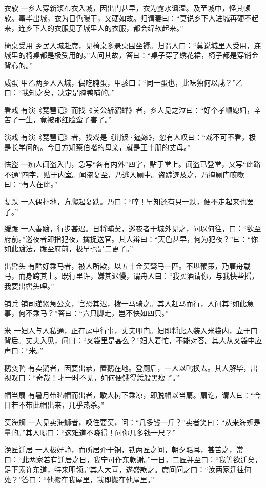 \documentclass[12pt,UTF8]{ctexbook}
\begin{document}
衣软
一乡人穿新浆布衣入城，因出门甚早，衣为露水讽湿。及至城中，怪其顿软。事毕出城，衣为日色曝干，又硬如故。归谓妻曰：“莫说乡下人进城再硬不起来，连乡下人的衣服见了城里人的衣服，都会绵软起来。”

椅桌受用
乡民入城赴席，见椅桌多悬桌围坐褥。归谓人曰：“莫说城里人受用，连城里的椅桌都是极受用的。”人问其故，答曰：“桌子穿了绣花裙，椅子都是穿销金背心的。”

咸蛋
甲乙两乡人入城，偶吃腌蛋，甲骇曰：“同一蛋也，此味独何以咸？”乙曰：“我知之矣，决定是腌鸭哺的。”

看戏
有演《琵琶记》而找《关公斩貂蝉》者，乡人见之泣曰：“好个孝顺媳妇，辛苦了一生，竟被那红脸蛮子害了。”

演戏
有演《琵琶记》者，找戏是《荆钗·逼嫁》，忽有人叹曰：“戏不可不看，极是长学问的。今日方知蔡伯喈的母亲，就是王十朋的丈母。”

怯盗
一痴人闻盗入门，急写“各有内外”四字，贴于堂上。闻盗已登堂，又写“此路不通”四字，贴于内室。闻盗复至，乃逃入厕中。盗踪迹及之，乃掩厕门咳嗽曰：“有人在此。”

复跌
一人偶扑地，方爬起复跌。乃曰：“啐！早知还有只一跌，便不走起来也罢了。”

缓踱
一人善踱，行步甚迟。日将晡矣，巡夜者于城外见之，问以何往，曰：“欲至府前。”巡夜者即指犯夜，擒捉送官。其人辩曰：“天色甚早，何为犯夜？”曰：“你如此踱法，踱至府前，极早也是二更了。”

出辔头
有酷好乘马者，被人所欺，以五十金买驽马一匹。不堪鞭策，乃雇舟载马，而身跨其上。既行里许，嫌其迟慢，谓舟人曰：“我买酒请你，与我快些摇，我要出辔头哩。”

铺兵
铺司递紧急公文，官恐其迟，拨一马骑之。其人赶马而行，人问其“如此急事，何不乘马？”答曰：“六只脚走，岂不快如四只。”

米
一妇人与人私通，正在房中行事，丈夫叩门。妇即将此人装入米袋内，立于门背后。丈夫入见，问曰：“叉袋里是甚么？”妇人着忙，不能对答。其人从叉袋中应声曰：“米。”

鹅变鸭
有卖鹅者，因要出恭，置鹅在地。登厕后，一人以鸭换去。其人解毕，出视叹曰：“奇哉！才一时不见，如何便饿得恁般黑瘦了。”

帽当扇
有暑月带毡帽而出者，歇大树下乘凉，即脱帽以当扇。扇讫，谓人曰：“今日若不带此帽出来，几乎热杀。”

买海蛳
一人见卖海蛳者，唤住要买，问：“几多钱一斤？”卖者笑曰：“从来海蛳是量的。”其人喝曰：“这难道不晓得！问你几多钱一尺？”

浼匠迁居
一人极好静，而所居介于铜，铁两匠之间，朝夕聒耳，甚苦之，常曰：“此两家若有迁居之日，我宁可作东款谢。”一日，二匠并至曰：“我等欲迁矣，足下素许东道，特来叩领。”其人大喜，遂盛款之。席间问之曰：“汝两家迁往何处？”答曰：“他搬在我屋里，我即搬在他屋里。”
\end{document}
